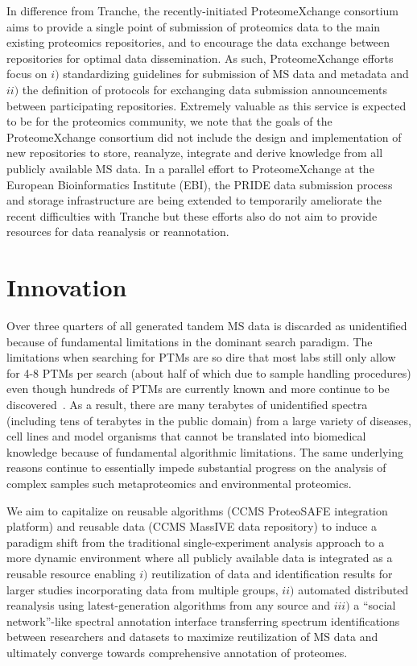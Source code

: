 \documentclass[arial,11pt]{article}
\begin{document}
In difference from Tranche, the recently-initiated ProteomeXchange consortium aims to provide a single point of submission of proteomics data to the main existing proteomics repositories, and to encourage the data exchange between repositories for optimal data dissemination. As such, ProteomeXchange efforts focus on $i)$ standardizing guidelines for submission of MS  data and metadata and $ii)$ the definition of protocols for exchanging data submission announcements between participating repositories. Extremely valuable as this service is expected to be for the proteomics community, we note that the goals of the ProteomeXchange consortium did not include the design and implementation of new repositories to store, reanalyze, integrate and derive knowledge from all publicly available MS  data. In a parallel effort to ProteomeXchange at the European Bioinformatics Institute (EBI), the PRIDE data submission process and storage infrastructure are being extended to temporarily ameliorate the recent difficulties with Tranche but these efforts also do not aim to provide resources for data reanalysis or reannotation.

\section{Innovation}


Over three quarters of all generated
 tandem MS  data
 is discarded as unidentified because of fundamental limitations in the dominant search paradigm. The limitations when searching for PTMs are so dire that most labs still only allow for 4-8 PTMs per search (about half of which due to sample handling procedures) even though hundreds of PTMs are currently known and more continue to be discovered~\cite{peng11}. As a result, there are many terabytes of unidentified spectra (including tens of terabytes in the public domain) from a large variety of diseases, cell lines and model organisms that cannot be translated into biomedical knowledge because of fundamental algorithmic limitations. The same underlying reasons continue to essentially impede substantial progress on the analysis of complex samples such metaproteomics and environmental proteomics.

We aim to capitalize on reusable algorithms (CCMS ProteoSAFE integration platform) and reusable data (CCMS MassIVE data repository) to induce a paradigm shift from the traditional single-experiment analysis approach to a more dynamic environment where all publicly available data is integrated as a reusable resource enabling $i)$ reutilization of data and identification results for larger studies incorporating data from multiple groups, $ii)$ automated distributed reanalysis using latest-generation algorithms from any source and $iii)$ a ``social network''-like spectral annotation interface transferring spectrum identifications between researchers and datasets to maximize reutilization of MS  data and ultimately converge towards comprehensive annotation of proteomes.
\end{document}
